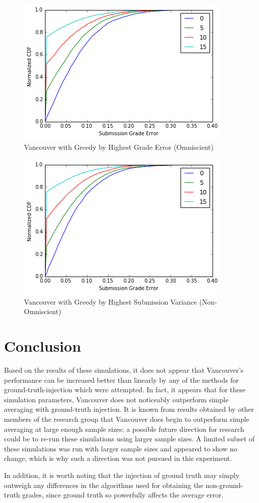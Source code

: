 \documentclass{article}
\begin{document}
	\begin{figure}[h]
		\includegraphics{vancouver-highest-grade-error}
		\caption{Vancouver with Greedy by Highest Grade Error (Omniscient)}
		\label{fig:vancouver-highest-grade-error}
	\end{figure}
	
	\begin{figure}[h]
		\includegraphics{vancouver-highest-submission-variance}
		\caption{Vancouver with Greedy by Highest Submission Variance (Non-Omniscient)}
		\label{fig:vancouver-highest-sumbission-variance}
	\end{figure}
	
	
	\section{Conclusion}
	Based on the results of these simulations, it does not appear that Vancouver's performance can be increased better than linearly by any of the methods for ground-truth-injection which were attempted. In fact, it appears that for these simulation parameters, Vancouver does not noticeably outperform simple averaging with ground-truth injection. It is known from results obtained by other members of the research group that Vancouver does begin to outperform simple averaging at large enough sample sizes; a possible future direction for research could be to re-run these simulations using larger sample sizes. A limited subset of these simulations was run with larger sample sizes and appeared to show no change, which is why such a direction was not pursued in this experiment. 
	
	In addition, it is worth noting that the injection of ground truth may simply outweigh any differences in the algorithms used for obtaining the non-ground-truth grades, since ground truth so powerfully affects the average error.
	
\end{document}
